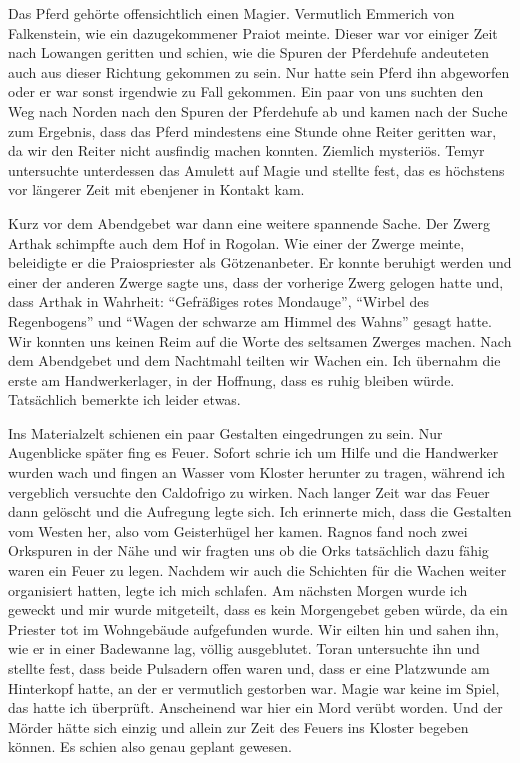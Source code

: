 Das Pferd gehörte offensichtlich einen Magier. Vermutlich Emmerich von Falkenstein, wie ein dazugekommener Praiot meinte. Dieser war vor einiger Zeit nach Lowangen geritten und schien, wie die Spuren der Pferdehufe andeuteten auch aus dieser Richtung gekommen zu sein. Nur hatte sein Pferd ihn abgeworfen oder er war sonst irgendwie zu Fall gekommen. Ein paar von uns suchten den Weg nach Norden nach den Spuren der Pferdehufe ab und kamen nach der Suche zum Ergebnis, dass das Pferd mindestens eine Stunde ohne Reiter geritten war, da wir den Reiter nicht ausfindig machen konnten. Ziemlich mysteriös. Temyr untersuchte unterdessen das Amulett auf Magie und stellte fest, das es höchstens vor längerer Zeit mit ebenjener in Kontakt kam.


Kurz vor dem Abendgebet war dann eine weitere spannende Sache. Der Zwerg Arthak schimpfte auch dem Hof in Rogolan. Wie einer der Zwerge meinte, beleidigte er die Praiospriester als Götzenanbeter. Er konnte beruhigt werden und einer der anderen Zwerge sagte uns, dass der vorherige Zwerg gelogen hatte und, dass Arthak in Wahrheit: ``Gefräßiges rotes Mondauge'', ``Wirbel des Regenbogens'' und ``Wagen der schwarze am Himmel des Wahns'' gesagt hatte. Wir konnten uns keinen Reim auf die Worte des seltsamen Zwerges machen. Nach dem Abendgebet und dem Nachtmahl teilten wir Wachen ein. Ich übernahm die erste am Handwerkerlager, in der Hoffnung, dass es ruhig bleiben würde. Tatsächlich bemerkte ich leider etwas.


Ins Materialzelt schienen ein paar Gestalten eingedrungen zu sein. Nur Augenblicke später fing es Feuer. Sofort schrie ich um Hilfe und die Handwerker wurden wach und fingen an Wasser vom Kloster herunter zu tragen, während ich vergeblich versuchte den Caldofrigo zu wirken. Nach langer Zeit war das Feuer dann gelöscht und die Aufregung legte sich. Ich erinnerte mich, dass die Gestalten vom Westen her, also vom Geisterhügel her kamen. Ragnos fand noch zwei Orkspuren in der Nähe und wir fragten uns ob die Orks tatsächlich dazu fähig waren ein Feuer zu legen. Nachdem wir auch die Schichten für die Wachen weiter organisiert hatten, legte ich mich schlafen. Am nächsten Morgen wurde ich geweckt und mir wurde mitgeteilt, dass es kein Morgengebet geben würde, da ein Priester tot im Wohngebäude aufgefunden wurde. Wir eilten hin und sahen ihn, wie er in einer Badewanne lag, völlig ausgeblutet. Toran untersuchte ihn und stellte fest, dass beide Pulsadern offen waren und, dass er eine Platzwunde am Hinterkopf hatte, an der er vermutlich gestorben war. Magie war keine im Spiel, das hatte ich überprüft. Anscheinend war hier ein Mord verübt worden. Und der Mörder hätte sich einzig und allein zur Zeit des Feuers ins Kloster begeben können. Es schien also genau geplant gewesen. 


